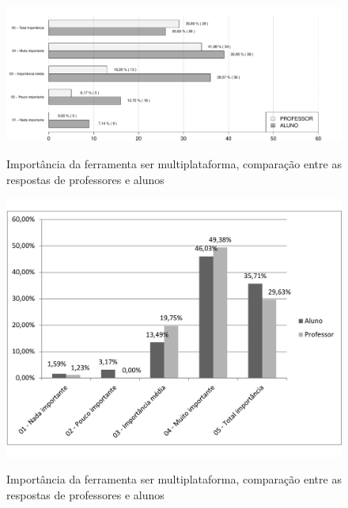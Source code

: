 \begin{figure}[!h]
\centering
\caption{Importância da ferramenta ser multiplataforma, comparação entre as respostas de professores e alunos}
\includegraphics[width=1.0\textwidth]{pdfs/alunos-professores/funcionalidades-retorno.pdf} 
\label{fig:grafico_multiplataforma} 
\end{figure}


\begin{figure}[!h]
\centering
\caption{Importância da ferramenta ser multiplataforma, comparação entre as respostas de professores e alunos}
\includegraphics[width=1.0\textwidth]{pesquisa/multiplataforma-relativo.pdf} 
\label{fig:grafico_multiplataforma} 
\end{figure}

